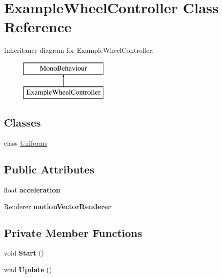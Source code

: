 \hypertarget{class_example_wheel_controller}{}\section{Example\+Wheel\+Controller Class Reference}
\label{class_example_wheel_controller}
Inheritance diagram for Example\+Wheel\+Controller\+:\begin{figure}[H]
\begin{center}
\leavevmode
\includegraphics[height=2.000000cm]{class_example_wheel_controller}
\end{center}
\end{figure}
\subsection*{Classes}
\begin{DoxyCompactItemize}
\item 
class \hyperlink{class_example_wheel_controller_1_1_uniforms}{Uniforms}
\end{DoxyCompactItemize}
\subsection*{Public Attributes}
\begin{DoxyCompactItemize}
\item 
\mbox{\label{class_example_wheel_controller_a4da6bd05730ce6b82fbf340e1edd6c58}} 
float {\bfseries acceleration}
\item 
\mbox{\label{class_example_wheel_controller_ae7f3dc107a18fda83dff42269da86c00}} 
Renderer {\bfseries motion\+Vector\+Renderer}
\end{DoxyCompactItemize}
\subsection*{Private Member Functions}
\begin{DoxyCompactItemize}
\item 
\mbox{\label{class_example_wheel_controller_a7cfb5b69c488c272c31e080d1b2f7bab}} 
void {\bfseries Start} ()
\item 
\mbox{\label{class_example_wheel_controller_a0598693ebb08f2a044a6d6518ca47acb}} 
void {\bfseries Update} ()
\end{DoxyCompactItemize}
